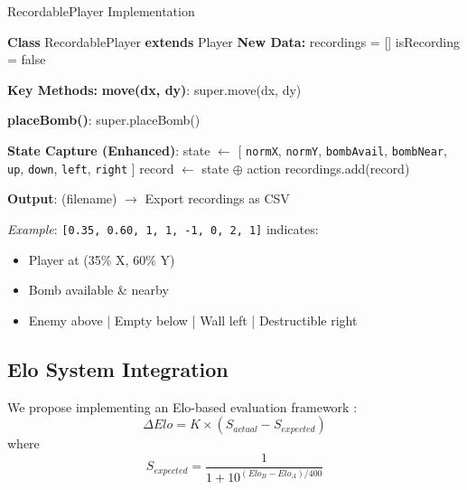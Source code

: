 \documentclass[sigconf]{acmart} %
\begin{document}
\begin{algorithm}[t]
	\caption{RecordablePlayer Implementation}
	\label{alg:recording}
	\DontPrintSemicolon
	
	\textbf{Class} RecordablePlayer \textbf{extends} Player\;
	\nl\textbf{New Data:} 
	recordings = [] 
	isRecording = false 
	
	\BlankLine
	\nl\textbf{Key Methods:}\;
	\nl \textbf{move(dx, dy)}:
	super.move(dx, dy)\;
	
	\nl \textbf{placeBomb()}:
	super.placeBomb()\;
	
	\nl\textbf{State Capture (Enhanced)}:
	state $\leftarrow$ [%
	\texttt{normX}, \texttt{normY}, 
	\texttt{bombAvail}, 
	\texttt{bombNear}, 
	\texttt{up}, \texttt{down}, \texttt{left}, \texttt{right} 
	]\;
	record $\leftarrow$ state $\oplus$ action 
	recordings.add(record)\;
	
	\nl\textbf{Output}:
	\Save(filename) $\rightarrow$ Export recordings as CSV\;
\end{algorithm}

\textit{Example}: \texttt{[0.35, 0.60, 1, 1, -1, 0, 2, 1]} indicates:
\begin{itemize}
	\item Player at (35\% X, 60\% Y)
	\item Bomb available \& nearby
	\item Enemy above | Empty below | Wall left | Destructible right
\end{itemize}

\subsection{Elo System Integration}
We propose implementing an Elo-based evaluation framework \cite{elo1978, coulom2017}:
\begin{equation}
	\Delta Elo = K \times (S_{actual} - S_{expected})
\end{equation}
where 
\begin{equation}
	S_{expected} = \frac{1}{1 + 10^{(Elo_B - Elo_A)/400}}
\end{equation}
\end{document}
